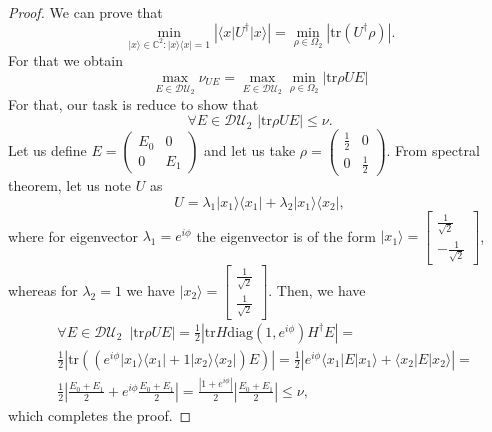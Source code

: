 \documentclass[preprint,12pt, a4paper]{elsarticle}
\newcommand{\ket}[1]{\ensuremath{|#1\rangle}}
\newcommand{\bra}[1]{\ensuremath{\langle#1|}}
\newcommand{\ketbra}[2]{\ensuremath{\ket{#1}\bra{#2}}}
\newcommand{\proj}[1]{\ensuremath{\ketbra{#1}{#1}}}
\newcommand{\1}{{\rm 1\hspace{-0.9mm}l}}
\newcommand{\diaguni}{\ensuremath{\mathcal{DU}}}
\newcommand{\diag}{\mathrm{diag}}
\newcommand{\tr}{\mathrm{tr}}
\begin{document}
\begin{proof}
	We can prove that
	\begin{equation}
	\min_{\ket{x} \in \mathbb{C}^2:   \proj{x} = 1} |\bra{x}U^\dagger\ket{x}| = 
	\min_{\rho \in \Omega_2} |\tr(U^\dagger\rho)|. 
	\end{equation}
	For that we obtain \begin{equation}
	\max_{E \in \diaguni_2 } \nu_{UE}  = \max_{E \in \diaguni_2 }  \min_{\rho \in 
		\Omega_2} \left| \tr \rho U E  \right|
	\end{equation}
	For that, our task is reduce to show that
	\begin{equation}
	\forall E \in \diaguni_2 \,\, | \tr \rho U E | \le \nu. 
	\end{equation}
	Let us define $E = \left(\begin{array}{cc}E_0&0\\0&E_1\end{array}\right)  $ 
	and let us take $\rho = 
	\left(\begin{array}{cc}\frac{1}{2}&0\\0&\frac{1}{2}\end{array}\right) $. 
	From spectral theorem, let us note $U$ as
	\begin{equation}
	U= \lambda_1 \ketbra{x_1}{x_1} + \lambda_2 \ketbra{x_1}{x_2}, 
	\end{equation}
	where  for eigenvector $\lambda_1 = e^{i \phi}$ the eigenvector is 
	of the form $\ket{x_1} = 
	\left[\begin{array}{c}\frac{1}{\sqrt{2}}\\-\frac{1}{\sqrt{2}}\end{array}\right]$,
	whereas for  $\lambda_2 = 1$ we have $\ket{x_2} = 
	\left[\begin{array}{c}\frac{1}{\sqrt{2}}\\\frac{1}{\sqrt{2}}\end{array}\right]$.
	Then, we have 
	\begin{equation}
	\begin{split}
	& \forall E \in \diaguni_2 \,\,\, | \tr \rho U E | = \frac{1}{2}  \left| \tr 
	H \diag(1, e^{i\phi}) H^\dagger E \right| =  \\ &
	\frac{1}{2} \left| \tr\left((  e^{i \phi} \proj{x_1} + 1 \proj{x_2} ) E \right) 
	\right|  = 
	\frac{1}{2} \left| e^{i \phi}  \bra{x_1} E \ket{x_1} + \bra{x_2} E \ket{x_2} 
	\right| = \\& 
	\frac{1}{2} \left| \frac{E_0 + E_1}{2} + e^{i \phi } \frac{E_0+E_1}{2} \right| 
	= 
	\frac{\left| 1+ e^{i \phi } \right|}{2} \left| \frac{E_0 + E_1}{2} \right| \le 
	\nu, 
	\end{split}
	\end{equation}
	which completes the proof.
\end{proof}
\end{document}

